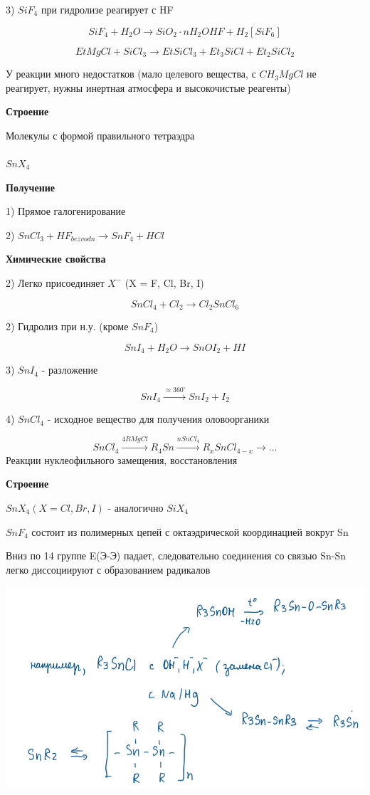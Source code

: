 \documentclass[14pt,a4paper]{scrartcl}
\begin{document}
3) $SiF_4$ при гидролизе реагирует с HF

$$SiF_4 + H_2O \rightarrow SiO_2\cdot nH_2O HF + H_2[SiF_6]$$

$$EtMgCl + SiCl_3 \rightarrow EtSiCl_3 + Et_3SiCl + Et_2SiCl_2$$

У реакции много недостатков (мало целевого вещества, с $CH_3MgCl$ не реагирует, нужны инертная атмосфера и высокочистые реагенты)

\textbf{Строение}

Молекулы с формой правильного тетраэдра\\
\\

$SnX_4$

\textbf{Получение}

1) Прямое галогенирование

2) $SnCl_3 + HF_{bezvodn} \rightarrow SnF_4 + HCl$

\textbf{Химические свойства}

2) Легко присоединяет $X^-$ (X = F, Cl, Br, I)

$$SnCl_4 + Cl_2 \rightarrow Cl_2SnCl_6$$

2) Гидролиз при н.у. (кроме $SnF_4$)

$$SnI_4 + H_2O \rightarrow SnOI_2 + HI$$

3) $SnI_4$ - разложение

$$SnI_4 \xrightarrow{\approx 360^{\circ}} SnI_2 + I_2$$

4) $SnCl_4$ - исходное вещество для получения оловоорганики

$$SnCl_4 \xrightarrow{4RMgCl} R_4Sn \xrightarrow{nSnCl_4} R_xSnCl_{4-x } \rightarrow ...$$
Реакции нуклеофильного замещения, восстановления

\textbf{Строение}

$SnX_4 (X = Cl, Br, I)$ - аналогично $SiX_4$

$SnF_4$ состоит из полимерных цепей  с октаэдрической координацией вокруг Sn

Вниз по 14 группе E(Э-Э) падает, следовательно соединения со связью Sn-Sn легко диссоциируют с образованием радикалов

\includegraphics{10v3.png}
\end{document}
